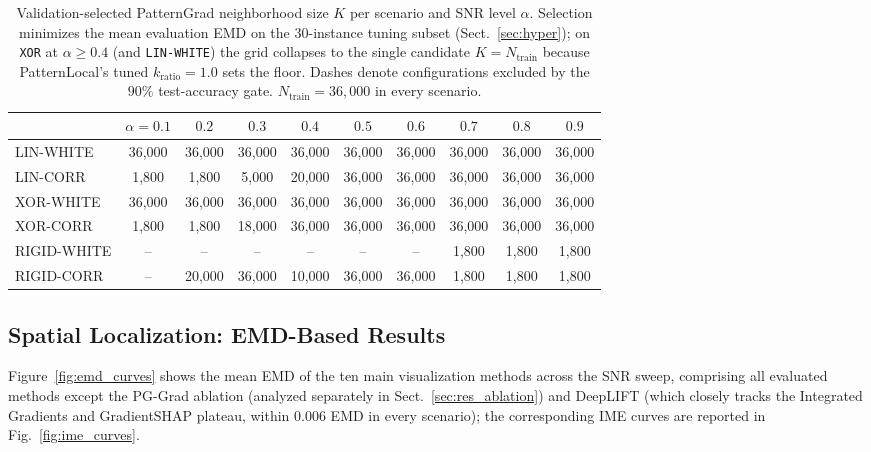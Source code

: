 \documentclass[pdflatex,sn-mathphys-num]{sn-jnl}
\theoremstyle{thmstyleone}
\theoremstyle{thmstyletwo}%
\theoremstyle{thmstylethree}%
\begin{document}
\begin{table}[t]
\centering
\caption{Validation-selected PatternGrad neighborhood size $K$ per scenario and SNR level $\alpha$. Selection minimizes the mean evaluation EMD on the $30$-instance tuning subset (Sect.~\ref{sec:hyper}); on \texttt{XOR} at $\alpha \ge 0.4$ (and \texttt{LIN-WHITE}) the grid collapses to the single candidate $K = N_{\text{train}}$ because PatternLocal's tuned $k_{\text{ratio}} = 1.0$ sets the floor. Dashes denote configurations excluded by the $90\%$ test-accuracy gate. $N_{\text{train}} = 36{,}000$ in every scenario.}
\label{tab:k_selection}
\footnotesize
\setlength{\tabcolsep}{3.2pt}
\begin{tabular}{lccccccccc}
\toprule
 & $\alpha=0.1$ & $0.2$ & $0.3$ & $0.4$ & $0.5$ & $0.6$ & $0.7$ & $0.8$ & $0.9$ \\
\midrule
LIN-WHITE  & 36{,}000 & 36{,}000 & 36{,}000 & 36{,}000 & 36{,}000 & 36{,}000 & 36{,}000 & 36{,}000 & 36{,}000 \\
LIN-CORR   & 1{,}800 & 1{,}800 & 5{,}000 & 20{,}000 & 36{,}000 & 36{,}000 & 36{,}000 & 36{,}000 & 36{,}000 \\
XOR-WHITE  & 36{,}000 & 36{,}000 & 36{,}000 & 36{,}000 & 36{,}000 & 36{,}000 & 36{,}000 & 36{,}000 & 36{,}000 \\
XOR-CORR   & 1{,}800 & 1{,}800 & 18{,}000 & 36{,}000 & 36{,}000 & 36{,}000 & 36{,}000 & 36{,}000 & 36{,}000 \\
RIGID-WHITE & -- & -- & -- & -- & -- & -- & 1{,}800 & 1{,}800 & 1{,}800 \\
RIGID-CORR & -- & 20{,}000 & 36{,}000 & 10{,}000 & 36{,}000 & 36{,}000 & 1{,}800 & 1{,}800 & 1{,}800 \\
\bottomrule
\end{tabular}
\end{table}

\subsection{Spatial Localization: EMD-Based Results}\label{sec:res_emd}

Figure~\ref{fig:emd_curves} shows the mean EMD of the ten main visualization methods across the SNR sweep, comprising all evaluated methods except the PG-Grad ablation (analyzed separately in Sect.~\ref{sec:res_ablation}) and DeepLIFT (which closely tracks the Integrated Gradients and GradientSHAP plateau, within $0.006$ EMD in every scenario); the corresponding IME curves are reported in Fig.~\ref{fig:ime_curves}.
\end{document}
